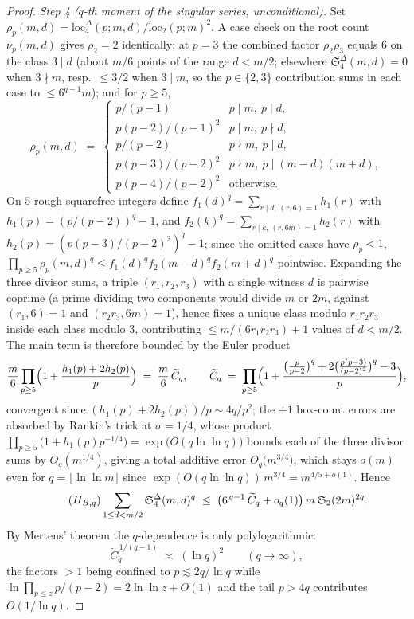 \documentclass[11pt]{article}
\theoremstyle{plain}
\theoremstyle{definition}
\begin{document}
\begin{proof}
\smallskip
\noindent\emph{Step 4 ($q$-th moment of the singular series,
unconditional).} Set
$\rho_p(m,d) = \mathrm{loc}_4^{\Delta}(p;m,d)/
\mathrm{loc}_2(p;m)^{2}$. A case check on the root count
$\nu_p(m,d)$ gives $\rho_2 = 2$ identically; at $p = 3$ the
combined factor $\rho_2\rho_3$ equals $6$ on the class
$3 \mid d$ (about $m/6$ points of the range $d < m/2$;
elsewhere $\mathfrak{S}_4^{\Delta}(m,d) = 0$ when $3 \nmid m$,
resp.\ $\le 3/2$ when $3 \mid m$, so the $p \in \{2,3\}$
contribution sums in each case to $\le 6^{q-1} m$); and for
$p \ge 5$,
\[
\rho_p(m,d) \;=\;
\begin{cases}
p/(p-1) & p \mid m,\ p \mid d,\\
p(p-2)/(p-1)^{2} & p \mid m,\ p \nmid d,\\
p/(p-2) & p \nmid m,\ p \mid d,\\
p(p-3)/(p-2)^{2} & p \nmid m,\ p \mid (m-d)(m+d),\\
p(p-4)/(p-2)^{2} & \text{otherwise.}
\end{cases}
\]
On $5$-rough squarefree integers define
$f_1(d)^{q} = \sum_{r \mid d,\, (r,6) = 1} h_1(r)$ with
$h_1(p) = (p/(p-2))^{q} - 1$, and
$f_2(k)^{q} = \sum_{r \mid k,\, (r,6m) = 1} h_2(r)$ with
$h_2(p) = (p(p-3)/(p-2)^{2})^{q} - 1$; since the omitted cases have
$\rho_p < 1$,
$\prod_{p \ge 5} \rho_p(m,d)^{q} \le
f_1(d)^{q} f_2(m-d)^{q} f_2(m+d)^{q}$ pointwise. Expanding the
three divisor sums, a triple $(r_1,r_2,r_3)$ with a single witness
$d$ is pairwise coprime (a prime dividing two components would
divide $m$ or $2m$, against $(r_1,6) = 1$ and
$(r_2 r_3, 6m) = 1$), hence fixes a unique class modulo
$r_1 r_2 r_3$ inside each class modulo $3$, contributing
$\le m/(6 r_1 r_2 r_3) + 1$ values of $d < m/2$. The main term is
therefore bounded by the Euler product
\[
\frac{m}{6} \prod_{p \ge 5}
\Bigl(1 + \frac{h_1(p) + 2 h_2(p)}{p}\Bigr)
\;=\; \frac{m}{6}\,\widetilde C_q,
\qquad
\widetilde C_q \;=\; \prod_{p \ge 5}
\Bigl(1 + \frac{\bigl(\frac{p}{p-2}\bigr)^{q}
 + 2\bigl(\frac{p(p-3)}{(p-2)^{2}}\bigr)^{q} - 3}{p}\Bigr),
\]
convergent since $(h_1(p) + 2h_2(p))/p \sim 4q/p^{2}$; the $+1$
box-count errors are absorbed by Rankin's trick at
$\sigma = 1/4$, whose product
$\prod_{p \ge 5} \bigl(1 + h_1(p)p^{-1/4}\bigr)
= \exp\bigl(O(q\ln\ln q)\bigr)$ bounds each of the three divisor
sums by $O_q(m^{1/4})$, giving a total additive error
$O_q\!\bigl(m^{3/4}\bigr)$, which stays $o(m)$ even for
$q = \lfloor \ln\ln m \rfloor$ since
$\exp(O(q\ln\ln q))\,m^{3/4} = m^{4/5+o(1)}$. Hence
\begin{equation}\label{eq:HBq}\tag{$H_{B,q}$}
\sum_{1 \le d < m/2} \mathfrak{S}_4^{\Delta}(m, d)^{q}
 \;\le\; \bigl(6^{\,q-1}\,\widetilde C_q + o_q(1)\bigr)\,
 m\,\mathfrak{S}_2(2m)^{2q} .
\end{equation}
By Mertens' theorem the $q$-dependence is only polylogarithmic:
\begin{equation}\label{eq:Cqest}
\widetilde C_q^{\,1/(q-1)} \;\asymp\; (\ln q)^{2}
\qquad (q \to \infty),
\end{equation}
the factors $> 1$ being confined to $p \lesssim 2q/\ln q$ while
$\ln \prod_{p \le z} p/(p-2) = 2\ln\ln z + O(1)$ and the tail
$p > 4q$ contributes $O(1/\ln q)$.


\end{proof}
\end{document}
